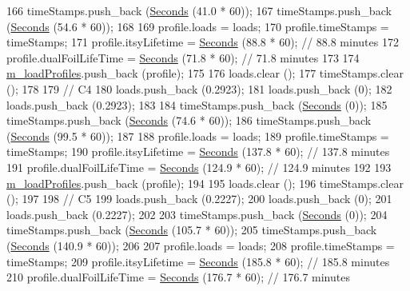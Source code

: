 \begin{DoxyCode}
166   timeStamps.push\_back (\hyperlink{group__timecivil_ga33c34b816f8ff6628e33d5c8e9713b9e}{Seconds} (41.0 * 60));
167   timeStamps.push\_back (\hyperlink{group__timecivil_ga33c34b816f8ff6628e33d5c8e9713b9e}{Seconds} (54.6 * 60));
168 
169   profile.loads = loads;
170   profile.timeStamps = timeStamps;
171   profile.itsyLifetime = \hyperlink{group__timecivil_ga33c34b816f8ff6628e33d5c8e9713b9e}{Seconds} (88.8 * 60);     \textcolor{comment}{// 88.8 minutes}
172   profile.dualFoilLifeTime = \hyperlink{group__timecivil_ga33c34b816f8ff6628e33d5c8e9713b9e}{Seconds} (71.8 * 60); \textcolor{comment}{// 71.8 minutes}
173 
174   \hyperlink{classBatteryLifetimeTest_aee9ad324da18f58ee75689778580c3fb}{m\_loadProfiles}.push\_back (profile);
175 
176   loads.clear ();
177   timeStamps.clear ();
178 
179   \textcolor{comment}{// C4}
180   loads.push\_back (0.2923);
181   loads.push\_back (0);
182   loads.push\_back (0.2923);
183 
184   timeStamps.push\_back (\hyperlink{group__timecivil_ga33c34b816f8ff6628e33d5c8e9713b9e}{Seconds} (0));
185   timeStamps.push\_back (\hyperlink{group__timecivil_ga33c34b816f8ff6628e33d5c8e9713b9e}{Seconds} (74.6 * 60));
186   timeStamps.push\_back (\hyperlink{group__timecivil_ga33c34b816f8ff6628e33d5c8e9713b9e}{Seconds} (99.5 * 60));
187 
188   profile.loads = loads;
189   profile.timeStamps = timeStamps;
190   profile.itsyLifetime = \hyperlink{group__timecivil_ga33c34b816f8ff6628e33d5c8e9713b9e}{Seconds} (137.8 * 60);      \textcolor{comment}{// 137.8 minutes}
191   profile.dualFoilLifeTime = \hyperlink{group__timecivil_ga33c34b816f8ff6628e33d5c8e9713b9e}{Seconds} (124.9 * 60);  \textcolor{comment}{// 124.9 minutes}
192 
193   \hyperlink{classBatteryLifetimeTest_aee9ad324da18f58ee75689778580c3fb}{m\_loadProfiles}.push\_back (profile);
194 
195   loads.clear ();
196   timeStamps.clear ();
197 
198   \textcolor{comment}{// C5}
199   loads.push\_back (0.2227);
200   loads.push\_back (0);
201   loads.push\_back (0.2227);
202 
203   timeStamps.push\_back (\hyperlink{group__timecivil_ga33c34b816f8ff6628e33d5c8e9713b9e}{Seconds} (0));
204   timeStamps.push\_back (\hyperlink{group__timecivil_ga33c34b816f8ff6628e33d5c8e9713b9e}{Seconds} (105.7 * 60));
205   timeStamps.push\_back (\hyperlink{group__timecivil_ga33c34b816f8ff6628e33d5c8e9713b9e}{Seconds} (140.9 * 60));
206 
207   profile.loads = loads;
208   profile.timeStamps = timeStamps;
209   profile.itsyLifetime = \hyperlink{group__timecivil_ga33c34b816f8ff6628e33d5c8e9713b9e}{Seconds} (185.8 * 60);      \textcolor{comment}{// 185.8 minutes}
210   profile.dualFoilLifeTime = \hyperlink{group__timecivil_ga33c34b816f8ff6628e33d5c8e9713b9e}{Seconds} (176.7 * 60);  \textcolor{comment}{// 176.7 minutes}

\end{DoxyCode}
